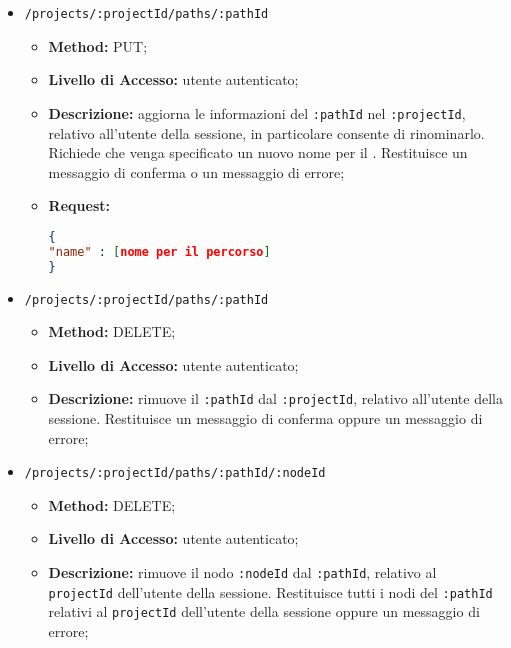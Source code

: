 \begin{itemize}
\begin{itemize}
\begin{lstlisting}[language=json,firstnumber=1]
{
"name": [nome del percorso]
"nodes" : [array \gloxy{JSON} di nodi, con attributi specificati nei diagrammi delle classi]
}
\end{lstlisting}
\end{itemize}
\item \texttt{/projects/:projectId/paths/:pathId}
\begin{itemize}
\item \textbf{Method:} PUT;
\item \textbf{Livello di Accesso:} utente autenticato;
\item \textbf{Descrizione:} aggiorna le informazioni del  \texttt{:pathId} nel  \texttt{:projectId}, relativo all'utente della sessione, in particolare consente di rinominarlo. Richiede che venga specificato un nuovo nome per il . Restituisce un messaggio di conferma o un messaggio di errore;
\item \textbf{Request:}
\begin{lstlisting}[language=json,firstnumber=1]
{
"name" : [nome per il percorso]
}
\end{lstlisting}
\end{itemize}
\item \texttt{/projects/:projectId/paths/:pathId}
\begin{itemize}
\item \textbf{Method:} DELETE;
\item \textbf{Livello di Accesso:} utente autenticato;
\item \textbf{Descrizione:} rimuove il  \texttt{:pathId} dal  \texttt{:projectId}, relativo all'utente della sessione. Restituisce un messaggio di conferma oppure un messaggio di errore;
\end{itemize}
\item \texttt{/projects/:projectId/paths/:pathId/:nodeId}
\begin{itemize}
\item \textbf{Method:} DELETE;
\item \textbf{Livello di Accesso:} utente autenticato;
\item \textbf{Descrizione:} rimuove il nodo \texttt{:nodeId} dal  \texttt{:pathId}, relativo al  \texttt{projectId} dell'utente della sessione. Restituisce tutti i nodi del  \texttt{:pathId} relativi al  \texttt{projectId} dell'utente della sessione oppure un messaggio di errore;

\end{itemize}
\end{itemize}
